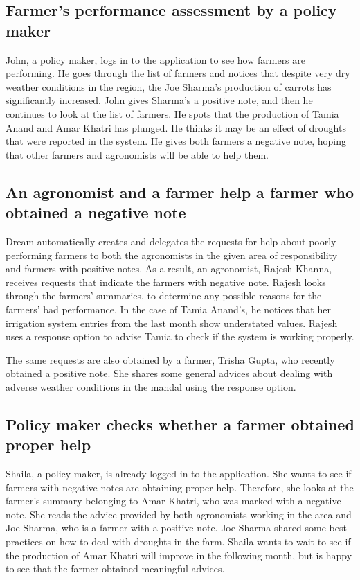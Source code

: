 \subsection*{Farmer's performance assessment by a policy maker}
John, a policy maker, logs in to the application to see how farmers are performing. He goes through the list of farmers and notices that despite very dry weather conditions in the region, the Joe Sharma's production of carrots has significantly increased. John gives Sharma's a positive note, and then he continues to look at the list of farmers. He spots that the production of Tamia Anand and Amar Khatri has plunged. He thinks it may be an effect of droughts that were reported in the system. He gives both farmers a negative note, hoping that other farmers and agronomists will be able to help them. 

\subsection*{An agronomist and a farmer help a farmer who obtained a negative note}
Dream automatically creates and delegates the requests for help about poorly performing farmers to both the agronomists in the given area of responsibility and farmers with positive notes. As a result, an agronomist, Rajesh Khanna, receives requests that indicate the farmers with negative note. Rajesh looks through the farmers' summaries, to determine any possible reasons for the farmers' bad performance. In the case of Tamia Anand's, he notices that her irrigation system entries from the last month show understated values. Rajesh uses a response option to advise Tamia to check if the system is working properly. 

The same requests are also obtained by a farmer, Trisha Gupta, who  recently obtained a positive note. She shares some general advices about dealing with adverse weather conditions in the mandal using the response option.

\subsection*{Policy maker checks whether a farmer obtained proper help}
Shaila, a policy maker, is already logged in to the application. She wants to see if farmers with negative notes are obtaining proper help. Therefore, she looks at the farmer's summary belonging to Amar Khatri, who was marked with a negative note. She reads the advice provided by both agronomists working in the area and Joe Sharma, who is a farmer with a positive note. Joe Sharma shared some best practices on how to deal with droughts in the farm. Shaila wants to wait to see if the production of Amar Khatri will improve in the following month, but is happy to see that the farmer obtained meaningful advices.

